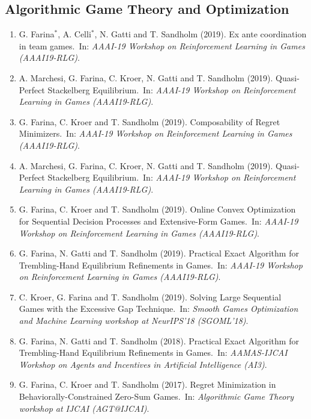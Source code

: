 \documentclass[10PT,letter]{article}
\newcounter{papercnt}
\newcommand{\equalcontrib}{$^*$}
\newcommand{\subsectionstyle}[1]{\normalfont\selectfont\textcolor{titlecol}{\sffamily #1}}
\newcommand{\newl}{~}
\begin{document}
            \subsection*{\subsectionstyle{Algorithmic Game Theory and Optimization}}
            \begin{enumerate}[itemsep=.5mm]
                \setcounter{enumi}{\value{papercnt}}
                \item G. Farina\equalcontrib{}, A. Celli\equalcontrib{}, N. Gatti and T. Sandholm (2019). Ex ante coordination in team games.\newl In: \textit{AAAI-19 Workshop on Reinforcement Learning in Games (AAAI19-RLG)}.
                
                \item A. Marchesi, G. Farina, C. Kroer, N. Gatti and T. Sandholm (2019). Quasi-Perfect Stackelberg Equilibrium.\newl In: \textit{AAAI-19 Workshop on Reinforcement Learning in Games (AAAI19-RLG)}.
                
                \item G. Farina, C. Kroer and T. Sandholm (2019). Composability of Regret Minimizers.\newl In: \textit{AAAI-19 Workshop on Reinforcement Learning in Games (AAAI19-RLG)}.
                
                \item A. Marchesi, G. Farina, C. Kroer, N. Gatti and T. Sandholm (2019). Quasi-Perfect Stackelberg Equilibrium.\newl In: \textit{AAAI-19 Workshop on Reinforcement Learning in Games (AAAI19-RLG)}.
                
                \item G. Farina, C. Kroer and T. Sandholm (2019). Online Convex Optimization for Sequential Decision Processes and Extensive-Form Games.\newl In: \textit{AAAI-19 Workshop on Reinforcement Learning in Games (AAAI19-RLG)}.
                
                \item G. Farina, N. Gatti and T. Sandholm (2019). Practical Exact Algorithm for Trembling-Hand Equilibrium Refinements in Games.\newl In: \textit{AAAI-19 Workshop on Reinforcement Learning in Games (AAAI19-RLG)}.
                
                \item C. Kroer, G. Farina and T. Sandholm (2019). Solving Large Sequential Games with the Excessive Gap Technique.\newl In: \textit{Smooth Games Optimization and Machine Learning workshop at NeurIPS'18 (SGOML'18)}.
                
                \item G. Farina, N. Gatti and T. Sandholm (2018). Practical Exact Algorithm for Trembling-Hand Equilibrium Refinements in Games.\newl In: \emph{AAMAS-IJCAI Workshop on Agents and Incentives in Artificial Intelligence (AI3)}.

                
                \item G. Farina, C. Kroer and T. Sandholm (2017). Regret Minimization in Behaviorally-Constrained Zero-Sum Games.\newl In: \textit{Algorithmic Game Theory workshop at IJCAI (AGT@IJCAI)}.
            \end{enumerate}
            \setcounter{papercnt}{\value{enumi}}
            
\end{document}
